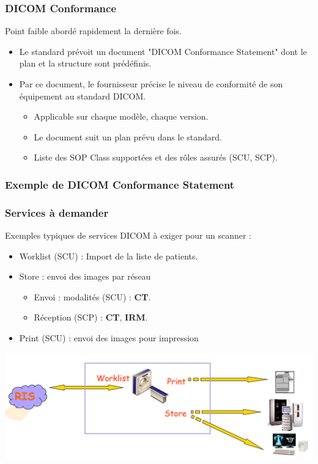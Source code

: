 \frame
{
	\frametitle{DICOM Conformance}
	Point faible abord\'e rapidement la derni\`ere fois.
	\begin{itemize}
		\item Le standard pr\'evoit un document "DICOM Conformance Statement" dont le plan et la structure sont pr\'ed\'efinis.
		\item Par ce document, le fournisseur pr\'ecise le niveau de conformit\'e de son \'equipement au standard DICOM.
		\begin{itemize}
			\item Applicable sur chaque mod\`ele, chaque version.
			\item Le document suit un plan pr\'evu dans le standard.
			\item Liste des SOP Class support\'ees et des r\^oles assur\'es (SCU, SCP).
		\end{itemize}
	\end{itemize}
}

\frame
{
	\frametitle{Exemple de DICOM Conformance Statement}
}

\frame
{
	\frametitle{Services \`a demander}
	Exemples typiques de services DICOM \`a exiger pour un scanner :
	\begin{itemize}
		\item Worklist (SCU) : Import de la liste de patients.
		\item Store : envoi des images par r\'eseau
		\begin{itemize}
			\item Envoi : modalit\'es (SCU) : \textbf{CT}.
			\item R\'eception (SCP) : \textbf{CT}, \textbf{IRM}.
		\end{itemize}
		\item Print (SCU) : envoi des images pour impression
	\end{itemize}
	
	\begin{center}
		\includegraphics[width=\linewidth]{./figures/services-ct.png}
	\end{center}

}

